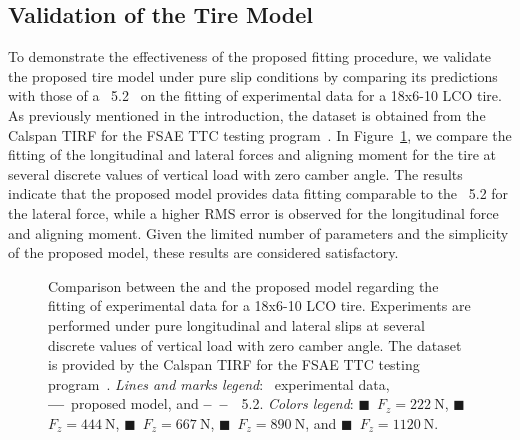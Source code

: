 \subsection{Validation of the Tire Model}

To demonstrate the effectiveness of the proposed fitting procedure, we validate the proposed tire model under pure slip conditions by comparing its predictions with those of a \MagicFormulae{}~5.2~\cite{pacejka2012tire} on the fitting of experimental data for a \Hoosier{} 18x6-10 LCO tire. As previously mentioned in the introduction, the dataset is obtained from the Calspan \ac{TIRF} for the \ac{FSAE} \ac{TTC} testing program~\cite{kasprzak2006formula}. In Figure~\ref{app3:fig:fsae_pure}, we compare the fitting of the longitudinal and lateral forces and aligning moment for the \Hoosier{} tire at several discrete values of vertical load with zero camber angle. The results indicate that the proposed model provides data fitting comparable to the \MagicFormulae{}~5.2 for the lateral force, while a higher \ac{RMS} error is observed for the longitudinal force and aligning moment. Given the limited number of parameters and the simplicity of the proposed model, these results are considered satisfactory.

\begin{figure}[htb]
  \centering
  \small{}
  \small{}
  \small{}
  \caption{Comparison between the \MagicFormulae{} and the proposed model regarding the fitting of experimental data for a \Hoosier{} 18x6-10 LCO tire. Experiments are performed under pure longitudinal and lateral slips at several discrete values of vertical load with zero camber angle. The dataset is provided by the Calspan \ac{TIRF} for the \ac{FSAE} \ac{TTC} testing program~\cite{kasprzak2006formula}. \emph{Lines and marks legend}: \textbullet~experimental data, \textbf{---}~proposed model, and \textbf{--~--}~\MagicFormulae{}~5.2. \emph{Colors legend}: \textcolor{mycolor1}{$\blacksquare$}~$F_z = \SI{222}{\newton}$, \textcolor{mycolor2}{$\blacksquare$}~$F_z = \SI{444}{\newton}$, \textcolor{mycolor3}{$\blacksquare$}~$F_z = \SI{667}{\newton}$, \textcolor{mycolor4}{$\blacksquare$}~$F_z = \SI{890}{\newton}$, and \textcolor{mycolor5}{$\blacksquare$}~$F_z = \SI{1120}{\newton}$.}
  \label{app3:fig:fsae_pure}
\end{figure}

